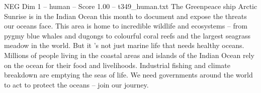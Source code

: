 \begin{textsample}{NEG Dim 1 – human – Score 1.00 – t349\_human.txt}  \label{ex:f1_neg_041}
The Greenpeace ship Arctic Sunrise is in the Indian Ocean this month to document and expose the threats our oceans face.
This area is home to incredible wildlife and ecosystems – from pygmy blue whales and dugongs to colourful coral reefs and the largest seagrass meadow in the world.
But it ’s not just marine life that needs healthy oceans.
Millions of people living in the coastal areas and islands of the Indian Ocean rely on the ocean for their food and livelihoods.
Industrial fishing and climate breakdown are emptying the seas of life.
We need governments around the world to act to protect the oceans – join our journey.

\end{textsample}
